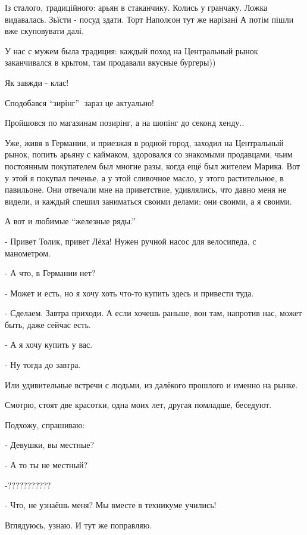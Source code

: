 
Із сталого, традиційного: арьян в стаканчику. Колись у гранчаку. Ложка
видавалась. Зьїсти - посуд здати. Торт Наполєон тут же нарізані А потім пішли
вже скуповувати далі.


У нас с мужем была традиция: каждый поход на Центральный рынок заканчивался в крытом, там продавали вкусные бургеры))


Як завжди - клас!

Сподобався \enquote{зирінг} 🤣зараз це актуально!

Пройшовся по магазинам позирінг, а на шопінг до секонд хенду..


Уже, живя в Германии, и приезжая в родной город, заходил на Центральный рынок,
попить арьяну с каймаком, здоровался со знакомыми продавцами, чьим постоянным
покупателем был многие разы, когда ещё был жителем Марика. Вот у этой я покупал
печенье, а у этой сливочное масло, у этого растительное, в павильоне. Они
отвечали мне на приветствие, удивлялись, что давно меня не видели, и каждый
спешил заниматься своими делами: они своими, а я своими. 

А вот и любимые \enquote{железные ряды.}

- Привет Толик, привет Лёха! Нужен ручной насос для велосипеда, с манометром.

- А что, в Германии нет?

- Может и есть, но я хочу хоть что-то купить здесь и привести туда.

- Сделаем. Завтра приходи. А если хочешь раньше, вон там, напротив нас, может
быть, даже сейчас есть.

- А я хочу купить у вас.

- Ну тогда до завтра.

Или удивительные встречи с людьми, из далёкого прошлого и именно на рынке.

Смотрю, стоят две красотки, одна моих лет, другая помладше, беседуют.

Подхожу, спрашиваю:

- Девушки, вы местные?

- А то ты не местный?

-???????????

- Что, не узнаёшь меня? Мы вместе в техникуме учились!

Вглядуюсь, узнаю. И тут же поправляю.

